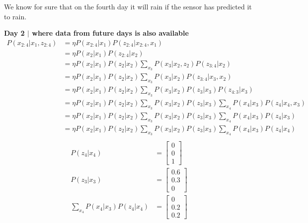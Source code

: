 \documentclass[answers]{exam}
\begin{document}
\begin{questions}
\begin{parts}
\begin{solution}
            We know for sure that on the fourth day it will rain if the sensor has predicted it to rain.

            \textbf{Day 2 $\mid$ where data from future days is also available}
            \begin{align*}
                P(x_{2:4} | x_1, z_{2:4}) &= \eta P(x_{2:4} | x_1) P(z_{2:4} | x_{2:4}, x_1) \\
                &= \eta P(x_{2} | x_1) P(z_{2:4} | x_2) \\
                &= \eta P(x_{2} | x_1) P(z_{2} | x_2) \sum_{x_3} P(x_3 | x_2, z_2) P(z_{3:4} | x_2) \\
                &= \eta P(x_{2} | x_1) P(z_{2} | x_2) \sum_{x_3} P(x_3 | x_2) P(z_{3:4} | x_3, x_2) \\
                &= \eta P(x_{2} | x_1) P(z_{2} | x_2) \sum_{x_3} P(x_3 | x_2) P(z_3 | x_3) P(z_{4:3} | x_3) \\
                &= \eta P(x_{2} | x_1) P(z_{2} | x_2) \sum_{x_3} P(x_3 | x_2) P(z_3 | x_3) \sum_{x_4} P(x_4 | x_3) P(z_4 | x_4, x_3) \\
                &= \eta P(x_{2} | x_1) P(z_{2} | x_2) \sum_{x_3} P(x_3 | x_2) P(z_3 | x_3) \sum_{x_4} P(x_4 | x_3) P(z_4 | x_3) \\
                &= \eta P(x_{2} | x_1) P(z_{2} | x_2) \sum_{x_3} P(x_3 | x_2) P(z_3 | x_3) \sum_{x_4} P(x_4 | x_3) P(z_4 | x_4) \\ 
            \end{align*}
            \begin{align*}    
                P(z_4 | x_4) &= \begin{bmatrix}
                0 \\
                0 \\
                1
                \end{bmatrix} \\
                P(z_3 | x_3) &= \begin{bmatrix}
                    0.6 \\
                    0.3 \\
                    0
                \end{bmatrix} \\
                \sum_{x_4} P(x_4 | x_3) P(z_4 | x_4) &= \begin{bmatrix} 0 \\ 0.2 \\ 0.2 \end{bmatrix} \\

\end{align*}
\end{solution}
\end{parts}
\end{questions}
\end{document}
